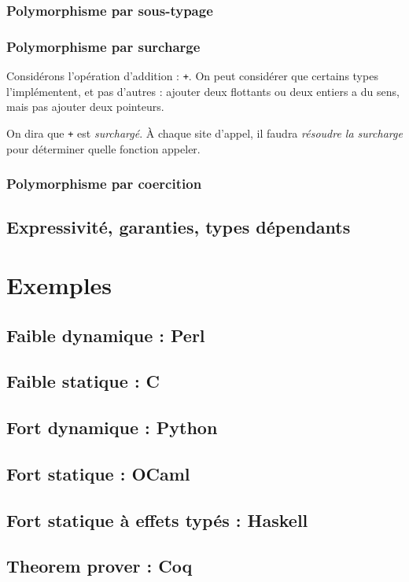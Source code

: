 \subsubsection{Polymorphisme par sous-typage}

\subsubsection{Polymorphisme par surcharge}

Considérons l'opération d'addition : \texttt{+}. On peut considérer que certains
types l'implémentent, et pas d'autres : ajouter deux flottants ou deux entiers a
du sens, mais pas ajouter deux pointeurs.

On dira que \texttt{+} est \emph{surchargé}. À chaque site d'appel, il faudra
\emph{résoudre la surcharge} pour déterminer quelle fonction appeler.

\subsubsection{Polymorphisme par coercition}


\subsection{Expressivité, garanties, types dépendants}

\section{Exemples}

\subsection{Faible dynamique : Perl}
\subsection{Faible statique : C}
\subsection{Fort dynamique : Python}
\subsection{Fort statique : OCaml}
\subsection{Fort statique à effets typés : Haskell}
\subsection{Theorem prover : Coq}
